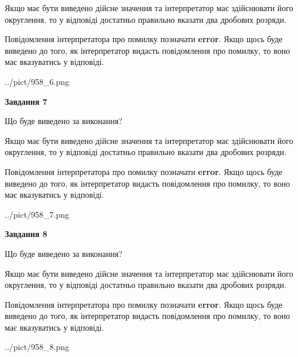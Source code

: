 \documentclass[12pt, ukrainian]{article}
\begin{document}
{\begin {Large}
Якщо має бути виведено дійсне значення та інтерпретатор має здійснювати його округлення, 
то у відповіді достатньо правильно вказати два дробових розряди.

Повідомлення інтерпретатора про помилку позначати \textbf{error}.
Якщо щось буде виведено до того, як інтерпретатор видасть повідомлення про помилку, 
то воно має вказуватись у відповіді. \par

\begin{center}
	{../pict/958_6.png}
\end{center}
\newpage

{\begin {center}\textbf{Завдання 7}\end {center}}\par
Що буде виведено за виконання? \par

Якщо має бути виведено дійсне значення та інтерпретатор має здійснювати його округлення, 
то у відповіді достатньо правильно вказати два дробових розряди.

Повідомлення інтерпретатора про помилку позначати \textbf{error}.
Якщо щось буде виведено до того, як інтерпретатор видасть повідомлення про помилку, 
то воно має вказуватись у відповіді. \par

\begin{center}
	{../pict/958_7.png}
\end{center}
\newpage

{\begin {center}\textbf{Завдання 8}\end {center}}\par
Що буде виведено за виконання? \par

Якщо має бути виведено дійсне значення та інтерпретатор має здійснювати його округлення, 
то у відповіді достатньо правильно вказати два дробових розряди.

Повідомлення інтерпретатора про помилку позначати \textbf{error}.
Якщо щось буде виведено до того, як інтерпретатор видасть повідомлення про помилку, 
то воно має вказуватись у відповіді. \par

\begin{center}
	{../pict/958_8.png}
\end{center}
\newpage


\end{Large}}
\end{document}
